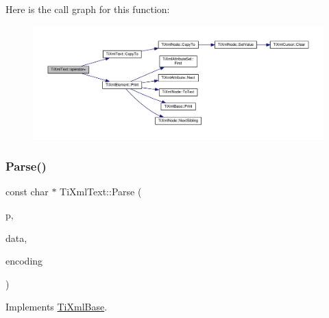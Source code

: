 Here is the call graph for this function\+:
\nopagebreak
\begin{figure}[H]
\begin{center}
\leavevmode
\includegraphics[width=350pt]{class_ti_xml_text_aed5b13f9c1b804c616fd533882c29f57_cgraph}
\end{center}
\end{figure}
\mbox{\label{class_ti_xml_text_a8d2dcfa41fc73d3e62dacc2fcf633819}} 
\subsubsection{\texorpdfstring{Parse()}{Parse()}}
{\footnotesize\ttfamily const char $\ast$ Ti\+Xml\+Text\+::\+Parse (\begin{DoxyParamCaption}\item[{const char $\ast$}]{p,  }\item[{\hyperlink{class_ti_xml_parsing_data}{Ti\+Xml\+Parsing\+Data} $\ast$}]{data,  }\item[{\hyperlink{tinyxml_8h_a88d51847a13ee0f4b4d320d03d2c4d96}{Ti\+Xml\+Encoding}}]{encoding }\end{DoxyParamCaption})\hspace{0.3cm}{\ttfamily [virtual]}}



Implements \hyperlink{class_ti_xml_base_a00e4edb0219d00a1379c856e5a1d2025}{Ti\+Xml\+Base}.


